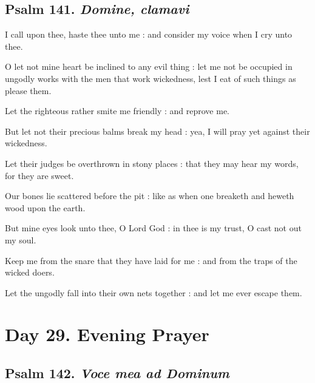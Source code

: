 \clearpage
\subsection{Psalm 141. \textit{Domine, clamavi}}

 I call upon thee, haste thee unto me : and consider my voice when I cry unto thee.\par
{}
O let not mine heart be inclined to any evil thing : let me not be occupied in ungodly works with the men that work wickedness, lest I eat of such things as please them.\par
{}Let the righteous rather smite me friendly : and reprove me.\par
{}But let not their precious balms break my head : yea, I will pray yet against their wickedness.\par
{}Let their judges be overthrown in stony places : that they may hear my words, for they are sweet.\par
{}Our bones lie scattered before the pit : like as when one breaketh and heweth wood upon the earth.\par
{}But mine eyes look unto thee, O Lord God : in thee is my trust, O cast not out my soul.\par
{}Keep me from the snare that they have laid for me : and from the traps of the wicked doers.\par
{}Let the ungodly fall into their own nets together : and let me ever escape them.\par


\section*{Day 29. Evening Prayer}

\subsection{Psalm 142. \textit{Voce mea ad Dominum}}

